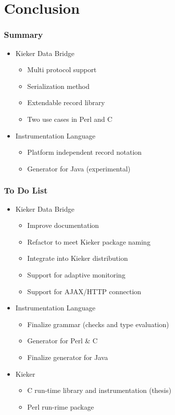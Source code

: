 
\section{Conclusion}

\begin{frame}[fragile]
\frametitle{Summary}
\begin{itemize}
\item Kieker Data Bridge
\begin{itemize}
\item Multi protocol support
\item Serialization method
\item Extendable record library
\item Two use cases in Perl and C
\end{itemize}
\end{itemize}
\begin{itemize}
\item Instrumentation Language
\begin{itemize}
\item Platform independent record notation
\item Generator for Java (experimental)
\end{itemize}
\end{itemize}
\end{frame}

\begin{frame}[fragile]
\frametitle{To Do List}
\begin{itemize}
\item Kieker Data Bridge
\begin{itemize}
\item Improve documentation
\item Refactor to meet Kieker package naming
\item Integrate into Kieker distribution
\item Support for adaptive monitoring
\item Support for AJAX/HTTP connection
\end{itemize}
\end{itemize}
\begin{itemize}
\item Instrumentation Language
\begin{itemize}
\item Finalize grammar (checks and type evaluation)
\item Generator for Perl \& C
\item Finalize generator for Java
\end{itemize}
\end{itemize}
\begin{itemize}
\item Kieker
\begin{itemize}
\item C run-time library and instrumentation (thesis)
\item Perl run-rime package
\end{itemize}
\end{itemize}
\end{frame}

